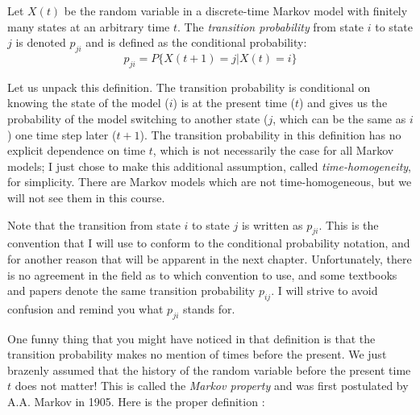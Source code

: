 \documentclass[
  letterpaper,
  DIV=11,
  numbers=noendperiod]{scrreprt}
\begin{document}
\begin{tcolorbox}[enhanced jigsaw, coltitle=black, arc=.35mm, opacitybacktitle=0.6, breakable, bottomtitle=1mm, toptitle=1mm, titlerule=0mm, colback=white, leftrule=.75mm, rightrule=.15mm, colframe=quarto-callout-note-color-frame, colbacktitle=quarto-callout-note-color!10!white, opacityback=0, title=\textcolor{quarto-callout-note-color}{\faInfo}\hspace{0.5em}{Definition}, left=2mm, toprule=.15mm, bottomrule=.15mm]

Let \(X(t)\) be the random variable in a discrete-time Markov model with
finitely many states at an arbitrary time \(t\). The \emph{transition
probability} from state \(i\) to state \(j\) is denoted \(p_{ji}\) and
is defined as the conditional probability:
\[ p_{ji} = P \{X(t+1) = j | X(t) = i \}\]

\end{tcolorbox}

Let us unpack this definition. The transition probability is conditional
on knowing the state of the model (\(i\)) is at the present time (\(t\))
and gives us the probability of the model switching to another state
(\(j\), which can be the same as \(i\)) one time step later (\(t+1\)).
The transition probability in this definition has no explicit dependence
on time \(t\), which is not necessarily the case for all Markov models;
I just chose to make this additional assumption, called
\emph{time-homogeneity}, for simplicity. There are Markov models which
are not time-homogeneous, but we will not see them in this course.

Note that the transition from state \(i\) to state \(j\) is written as
\(p_{ji}\). This is the convention that I will use to conform to the
conditional probability notation, and for another reason that will be
apparent in the next chapter. Unfortunately, there is no agreement in
the field as to which convention to use, and some textbooks and papers
denote the same transition probability \(p_{ij}\). I will strive to
avoid confusion and remind you what \(p_{ji}\) stands for.

One funny thing that you might have noticed in that definition is that
the transition probability makes no mention of times before the present.
We just brazenly assumed that the history of the random variable before
the present time \(t\) does not matter! This is called the \emph{Markov
property} and was first postulated by A.A. Markov in 1905. Here is the
proper definition \cite{feller_introduction_????}:
\end{document}
